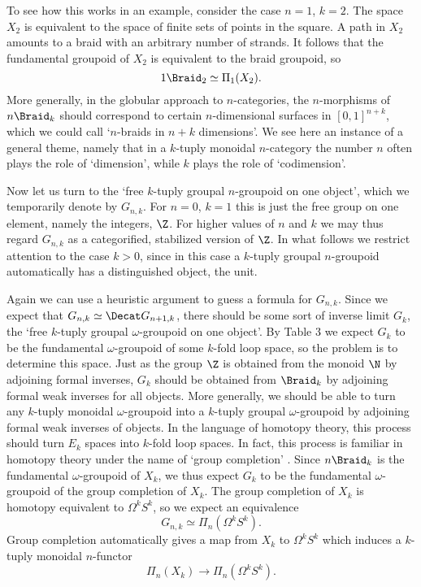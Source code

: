 To see how this works in an example, consider the case $n = 1$, $k = 2$.
The space $X_2$ is equivalent to the space of finite sets of points in
the square.  A path in $X_2$ amounts to a braid with an arbitrary number
of strands.  It follows that the fundamental groupoid of $X_2$ is
equivalent to the braid groupoid, so
\[     1\Braid_2 \simeq   \Pi_1(X_2)  .\]
More generally, in the globular approach to $n$-categories, the
$n$-morphisms of $n\Braid_k$ should correspond to certain
$n$-dimensional surfaces in $[0,1]^{n+k}$, which we could call
`$n$-braids in $n+k$ dimensions'.  We see here an instance of a general
theme, namely that in a $k$-tuply monoidal $n$-category the number $n$
often plays the role of `dimension', while $k$ plays the role of
`codimension'.

Now let us turn to the `free $k$-tuply groupal $n$-groupoid on one
object', which we temporarily denote by $G_{n,k}$.   For $n = 0$, $k =
1$ this is just the free group on one element, namely the integers,
$\Z$.   For higher values of $n$ and $k$ we may thus regard $G_{n,k}$ as
a categorified, stabilized version of $\Z$.   In what follows we restrict
attention to the case $k > 0$, since in this case a $k$-tuply groupal
$n$-groupoid automatically has a distinguished object, the unit.  

Again we can use a heuristic argument to guess a formula for $G_{n,k}$. 
Since we expect that $G_{n,k} \simeq \Decat G_{n+1,k}$, there should be
some sort of inverse limit $G_k$, the `free $k$-tuply groupal
$\omega$-groupoid on one object'.  By Table 3 we expect $G_k$ to be the
fundamental $\omega$-groupoid of some $k$-fold loop space, so the
problem is to determine this space.  Just as the group $\Z$ is obtained 
from the monoid $\N$ by adjoining formal inverses, $G_k$ should be 
obtained from $\Braid_k$ by adjoining formal weak inverses for all 
objects.  More generally, we should be able to turn any $k$-tuply
monoidal $\omega$-groupoid into a $k$-tuply groupal $\omega$-groupoid by
adjoining formal weak inverses of objects.   In the language of homotopy
theory, this process should turn $E_k$ spaces into $k$-fold loop spaces.
In fact, this process is familiar in homotopy theory under the name of
`group completion' \cite{BP}.   Since $n\Braid_k$ is the fundamental
$\omega$-groupoid of $X_k$, we thus expect $G_k$ to be the fundamental
$\omega$-groupoid of the group completion of $X_k$.  The group
completion of $X_k$ is homotopy equivalent to $\Omega^k S^k$, so we
expect an equivalence 
\[           G_{n,k} \simeq \Pi_n(\Omega^k S^k)  .\] 
Group completion automatically gives a map from $X_k$ to
$\Omega^k S^k$ which induces a $k$-tuply monoidal $n$-functor 
\[           \Pi_n(X_k) \to \Pi_n(\Omega^k S^k)   .\]


